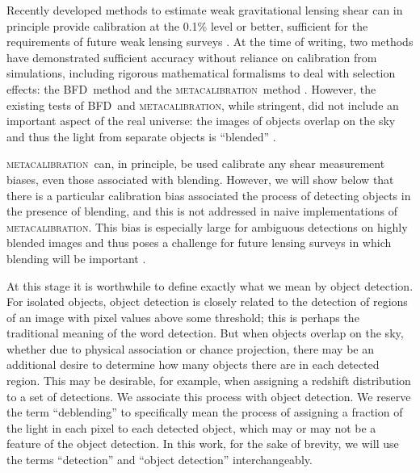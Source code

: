 \documentclass[iop, appendixfloats, numberedappendix, apj]{emulateapj}
\newcommand{\mcal}{\textsc{metacalibration}}
\newcommand{\bfd}{\textsc{BFD}}
\begin{document}
Recently developed methods to estimate weak gravitational lensing shear can in
principle provide calibration at the 0.1\% level or better, sufficient for the
requirements of future weak lensing surveys \citep[e.g.,][]{huterer2006}.  At
the time of writing, two methods have demonstrated sufficient accuracy without
reliance on calibration from simulations, including rigorous mathematical
formalisms to deal with selection effects:  the \bfd\ method
\citep{BernBFD2016} and the \mcal\ method \citep{HuffMcal2017,SheldonMcal2017}.
However, the existing tests of \bfd\ and \mcal, while stringent, did not
include an important aspect of the real universe: the images of objects overlap
on the sky and thus the light from separate objects is ``blended'' \citep[for
discussion of blending effects see, e.g.,][]{DawsonBlending2016}.

\mcal\ can, in principle, be used calibrate any shear measurement biases, even
those associated with blending.  However, we will show below that there is a
particular calibration bias associated the process of detecting objects in the
presence of blending, and this is not addressed in naive implementations of
\mcal. This bias is especially large for ambiguous detections on highly blended
images and thus poses a challenge for future lensing surveys in which
blending will be important \citep{DawsonBlending2016}.

At this stage it is worthwhile to define exactly what we mean by object
detection.  For isolated objects, object detection is closely related to the
detection of regions of an image with pixel values above some threshold; this
is perhaps the traditional meaning of the word detection. But when objects
overlap on the sky, whether due to physical association or chance projection,
there may be an additional desire to determine how many objects there are in
each detected region. This may be desirable, for example, when assigning a
redshift distribution to a set of detections.  We associate this process with
object detection.  We reserve the term ``deblending'' to specifically mean the
process of assigning a fraction of the light in each pixel to each detected
object, which may or may not be a feature of the object detection.  In this
work, for the sake of brevity, we will use the terms ``detection'' and ``object
detection'' interchangeably.
\end{document}
